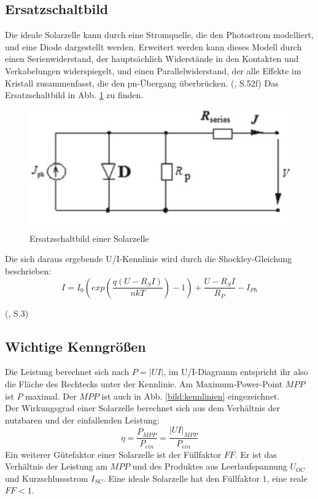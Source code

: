 

\subsection{Ersatzschaltbild}
Die ideale Solarzelle kann durch eine Stromquelle, die den Photostrom modelliert, und eine Diode dargestellt werden. 
Erweitert werden kann dieses Modell durch einen Serienwiderstand, der hauptsächlich Widerstände in den Kontakten und Verkabelungen
widerspiegelt, und einen Parallelwiderstand, der alle Effekte im Kristall zusammenfasst, die den pn-Übergang überbrücken.
(\cite{Shah2020}, S.52f)
Das Ersatzschaltbild in Abb. \ref{bild:ersatzschaltbild} zu finden.

\begin{figure}[h]
    \centering
    \includegraphics[scale=0.5]{Bilder/Ersatzschaltbild.png}
    \caption{Ersatzschaltbild einer Solarzelle \protect \footnotemark}
    \label{bild:ersatzschaltbild}
\end{figure}

Die sich daraus ergebende U/I-Kennlinie wird durch die Shockley-Gleichung beschrieben:
\begin{equation}
    I = I_0 (exp(\frac{q(U-R_SI)}{nkT})-1) + \frac{U-R_SI}{R_P} - I_{Ph}
\end{equation}

(\cite{Gerken2021}, S.3)

\subsection{Wichtige Kenngrößen}
Die Leistung berechnet sich nach $P = |UI|$, im U/I-Diagramm entspricht ihr also die Fläche des Rechtecks unter der Kennlinie. Am Maximum-Power-Point $MPP$ ist $P$ maximal. Der $MPP$ ist auch in Abb. \ref{bild:kennlinien} eingezeichnet. \\
Der Wirkungsgrad einer Solarzelle berechnet sich aus dem Verhältnis der nutzbaren und der einfallenden Leistung:
\begin{equation*}
\eta = \frac{P_{MPP}}{P_{ein}} = \frac{|UI|_{MPP}}{P_{ein}}
\end{equation*}
Ein weiterer Gütefaktor einer Solarzelle ist der Füllfaktor $FF$. Er ist das Verhältnis der Leistung am $MPP$ und des Produktes aus Leerlaufspannung $U_{OC}$ und Kurzschlussstrom $I_{SC}$. Eine ideale Solarzelle hat den Füllfaktor $1$, eine reale $FF < 1$.

